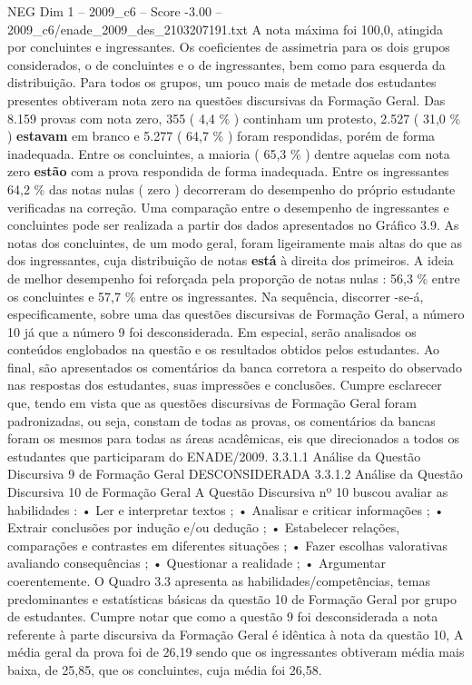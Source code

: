\begin{textsample}{NEG Dim 1 – 2009\_c6 – Score -3.00 – 2009\_c6/enade\_2009\_des\_2103207191.txt}
A nota máxima foi 100,0, atingida por concluintes e ingressantes.
Os coeficientes de assimetria para os dois grupos considerados, o de concluintes e o de ingressantes, bem como para esquerda da distribuição.
Para todos os grupos, um pouco mais de metade dos estudantes presentes obtiveram nota zero na questões discursivas da Formação Geral.
Das 8.159 provas com nota zero, 355 ( 4,4 \% ) continham um protesto, 2.527 ( 31,0 \% ) \textbf{estavam} em branco e 5.277 ( 64,7 \% ) foram respondidas, porém de forma inadequada.
Entre os concluintes, a maioria ( 65,3 \% ) dentre aquelas com nota zero \textbf{estão} com a prova respondida de forma inadequada.
Entre os ingressantes 64,2 \% das notas nulas ( zero ) decorreram do desempenho do próprio estudante verificadas na correção.
Uma comparação entre o desempenho de ingressantes e concluintes pode ser realizada a partir dos dados apresentados no Gráfico 3.9.
As notas dos concluintes, de um modo geral, foram ligeiramente mais altas do que as dos ingressantes, cuja distribuição de notas \textbf{está} à direita dos primeiros.
A ideia de melhor desempenho foi reforçada pela proporção de notas nulas : 56,3 \% entre os concluintes e 57,7 \% entre os ingressantes.
Na sequência, discorrer -se-á, especificamente, sobre uma das questões discursivas de Formação Geral, a número 10 já que a número 9 foi desconsiderada.
Em especial, serão analisados os conteúdos englobados na questão e os resultados obtidos pelos estudantes.
Ao final, são apresentados os comentários da banca corretora a respeito do observado nas respostas dos estudantes, suas impressões e conclusões.
Cumpre esclarecer que, tendo em vista que as questões discursivas de Formação Geral foram padronizadas, ou seja, constam de todas as provas, os comentários da bancas foram os mesmos para todas as áreas acadêmicas, eis que direcionados a todos os estudantes que participaram do ENADE/2009. 3.3.1.1 Análise da Questão Discursiva 9 de Formação Geral DESCONSIDERADA 3.3.1.2 Análise da Questão Discursiva 10 de Formação Geral A Questão Discursiva nº 10 buscou avaliar as habilidades : • Ler e interpretar textos ; • Analisar e criticar informações ; • Extrair conclusões por indução e/ou dedução ; • Estabelecer relações, comparações e contrastes em diferentes situações ; • Fazer escolhas valorativas avaliando consequências ; • Questionar a realidade ; • Argumentar coerentemente.
O Quadro 3.3 apresenta as habilidades/competências, temas predominantes e estatísticas básicas da questão 10 de Formação Geral por grupo de estudantes.
Cumpre notar que como a questão 9 foi desconsiderada a nota referente à parte discursiva da Formação Geral é idêntica à nota da questão 10, A média geral da prova foi de 26,19 sendo que os ingressantes obtiveram média mais baixa, de 25,85, que os concluintes, cuja média foi 26,58.

\end{textsample}
